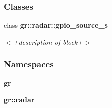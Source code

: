 \subsubsection*{Classes}
\begin{DoxyCompactItemize}
\item 
class {\bf gr\+::radar\+::gpio\+\_\+source\+\_\+s}
\begin{DoxyCompactList}\small\item\em $<$+description of block+$>$ \end{DoxyCompactList}\end{DoxyCompactItemize}
\subsubsection*{Namespaces}
\begin{DoxyCompactItemize}
\item 
 {\bf gr}
\item 
 {\bf gr\+::radar}
\end{DoxyCompactItemize}
